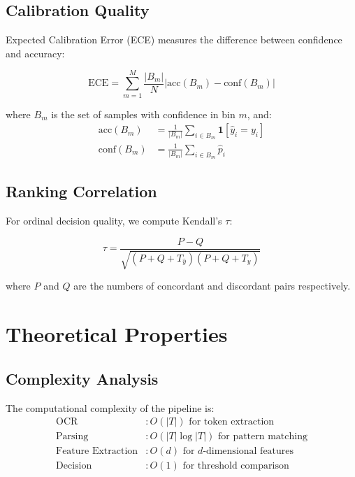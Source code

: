 \documentclass[11pt]{article}
\begin{document}
\subsection{Calibration Quality}
Expected Calibration Error (ECE) measures the difference between confidence and accuracy:

\begin{equation}
\text{ECE} = \sum_{m=1}^{M} \frac{|B_m|}{N} \left| \text{acc}(B_m) - \text{conf}(B_m) \right|
\end{equation}

where $B_m$ is the set of samples with confidence in bin $m$, and:
\begin{align}
\text{acc}(B_m) &= \frac{1}{|B_m|} \sum_{i \in B_m} \mathbf{1}[\hat{y}_i = y_i] \\
\text{conf}(B_m) &= \frac{1}{|B_m|} \sum_{i \in B_m} \hat{p}_i
\end{align}

\subsection{Ranking Correlation}
For ordinal decision quality, we compute Kendall's $\tau$:

\begin{equation}
\tau = \frac{P - Q}{\sqrt{(P + Q + T_{\hat{y}})(P + Q + T_y)}}
\end{equation}

where $P$ and $Q$ are the numbers of concordant and discordant pairs respectively.

\section{Theoretical Properties}

\subsection{Complexity Analysis}
The computational complexity of the pipeline is:
\begin{align}
\text{OCR} &: O(|T|) \text{ for token extraction} \\
\text{Parsing} &: O(|T| \log |T|) \text{ for pattern matching} \\
\text{Feature Extraction} &: O(d) \text{ for } d \text{-dimensional features} \\
\text{Decision} &: O(1) \text{ for threshold comparison}
\end{align}
\end{document}
